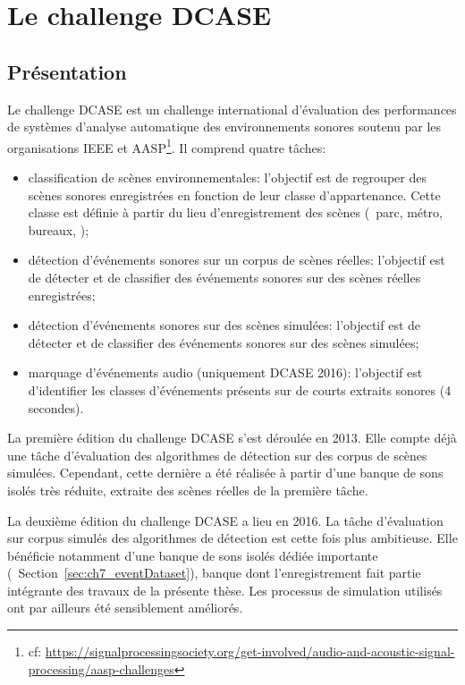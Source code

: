 \section{Le challenge DCASE}
\label{sec:ch6_challengeDcasePresentation}

\subsection{Présentation}

Le challenge DCASE est un challenge international d'évaluation des performances de systèmes d'analyse automatique des environnements sonores soutenu par les organisations IEEE et AASP\footnote{cf: \url{https://signalprocessingsociety.org/get-involved/audio-and-acoustic-signal-processing/aasp-challenges}}. Il comprend quatre tâches:

\begin{itemize}
\item classification de scènes environnementales: l'objectif est de regrouper des scènes sonores enregistrées en fonction de leur classe d'appartenance. Cette classe est définie à partir du lieu d'enregistrement des scènes (\eg~parc, métro, bureaux, \etc);
\item détection d'événements sonores sur un corpus de scènes réelles: l'objectif est de détecter et de classifier des événements sonores sur des scènes réelles enregistrées;
\item détection d'événements sonores sur des scènes simulées: l'objectif est de détecter et de classifier des événements sonores sur des scènes simulées;
\item marquage d'événements audio (uniquement DCASE 2016): l'objectif est d'identifier les classes d'événements présents sur de courts extraits sonores (4 secondes).
\end{itemize}

La première édition du challenge DCASE \citep{Giannoulis2013database, giannoulis2013detection, Stowell15} s'est déroulée en 2013. Elle compte déjà une tâche d'évaluation des algorithmes de détection sur des corpus de scènes simulées. Cependant, cette dernière a été réalisée à partir d'une banque de sons isolés très réduite, extraite des scènes réelles de la première tâche.

La deuxième édition du challenge DCASE a lieu en 2016. La tâche d'évaluation sur corpus simulés des algorithmes de détection est cette fois plus ambitieuse. Elle bénéficie notamment d'une banque de sons isolés dédiée importante (\cf~Section~\ref{sec:ch7_eventDataset}), banque dont l'enregistrement fait partie intégrante des travaux de la présente thèse. Les processus de simulation utilisés ont par ailleurs été sensiblement améliorés.

